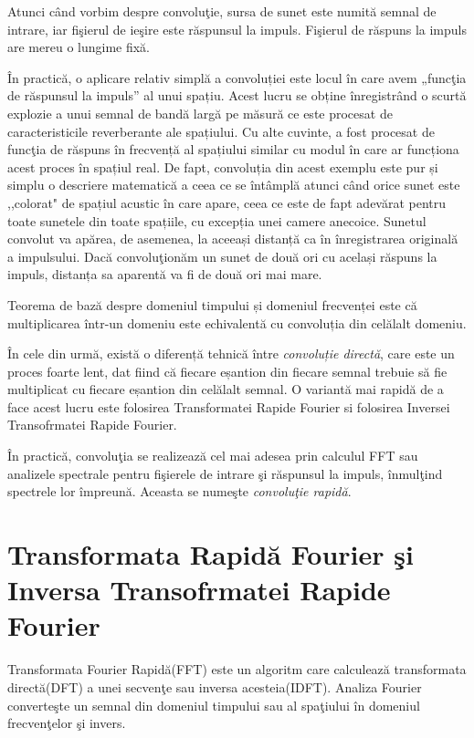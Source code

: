 	Atunci c\^{a}nd vorbim despre convolu\c{t}ie, sursa de sunet este numit\u{a} semnal de intrare, iar fi\c{s}ierul de ie\c{s}ire este r\u{a}spunsul la impuls. Fi\c{s}ierul de r\u{a}spuns la impuls are mereu o lungime fix\u{a}.
	\bigskip
	
	În practică, o aplicare relativ simplă a convoluției este locul în care avem „func\c{t}ia de răspunsul la impuls” al unui spațiu. Acest lucru se obține înregistrând o scurtă explozie a unui semnal de bandă largă pe măsură ce este procesat de caracteristicile reverberante ale spațiului. Cu alte cuvinte, a fost procesat de func\c{t}ia de răspuns în frecvență al spațiului similar cu modul în care ar funcționa acest proces în spațiul real. De fapt, convoluția din acest exemplu este pur și simplu o descriere matematică a ceea ce se întâmplă atunci când orice sunet este ,,colorat" de spațiul acustic în care apare, ceea ce este de fapt adevărat pentru toate sunetele din toate spațiile, cu excepția unei camere anecoice. Sunetul convolut va apărea, de asemenea, la aceeași distanță ca în înregistrarea originală a impulsului. Dacă convolu\c{t}ion\u{a}m un sunet de două ori cu același răspuns la impuls, distanța sa aparentă va fi de două ori mai mare.
	\bigskip
	
	Teorema de bază despre domeniul timpului și domeniul frecvenței este că multiplicarea într-un domeniu este echivalentă cu convoluția din celălalt domeniu.
	\bigskip
	
	În cele din urmă, există o diferență tehnică între \textit{convoluție directă}, care este un proces foarte lent, dat fiind că fiecare eșantion din fiecare semnal trebuie să fie multiplicat cu fiecare eșantion din celălalt semnal. O variant\u{a} mai rapid\u{a} de a face acest lucru este folosirea Transformatei Rapide Fourier si folosirea Inversei Transofrmatei Rapide Fourier.
	\bigskip
	
	\^{I}n practic\u{a}, convolu\c{t}ia se realizeaz\u{a} cel mai adesea prin calculul FFT sau analizele spectrale pentru fi\c{s}ierele de intrare \c{s}i r\u{a}spunsul la impuls, \^{i}nmul\c{t}ind spectrele lor \^{i}mpreun\u{a}. Aceasta se nume\c{s}te  \textit{convolu\c{t}ie rapid\u{a}}.
	
	\section{Transformata Rapid\u{a} Fourier \c{s}i Inversa Transofrmatei Rapide Fourier}
	
	Transformata Fourier Rapid\u{a}(FFT) este un algoritm care calculeaz\u{a} transformata direct\u{a}(DFT) a unei secven\c{t}e sau inversa acesteia(IDFT). Analiza Fourier converte\c{s}te un semnal din domeniul timpului sau al spa\c{t}iului \^{i}n domeniul frecven\c{t}elor \c{s}i invers.
	\bigskip
	

